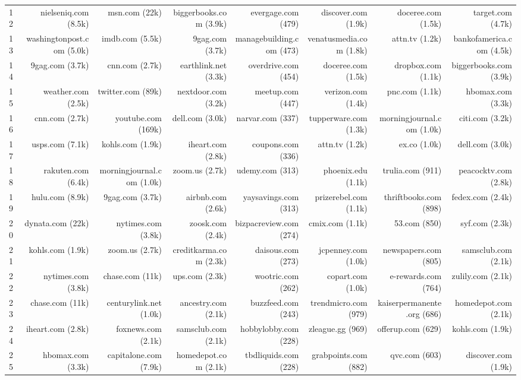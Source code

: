 \begin{table}
{\begin{tabular}[t]{lrrrrrrr}
12 & nielseniq.com (8.5k) & msn.com (22k) & biggerbooks.com (3.9k) & evergage.com (479) & discover.com (1.9k) & doceree.com (1.5k) & target.com (4.7k)\\
13 & washingtonpost.com (5.0k) & imdb.com (5.5k) & 9gag.com (3.7k) & managebuilding.com (473) & venatusmedia.com (1.8k) & attn.tv (1.2k) & bankofamerica.com (4.5k)\\
14 & 9gag.com (3.7k) & cnn.com (2.7k) & earthlink.net (3.3k) & overdrive.com (454) & doceree.com (1.5k) & dropbox.com (1.1k) & biggerbooks.com (3.9k)\\
15 & weather.com (2.5k) & twitter.com (89k) & nextdoor.com (3.2k) & meetup.com (447) & verizon.com (1.4k) & pnc.com (1.1k) & hbomax.com (3.3k)\\
16 & cnn.com (2.7k) & youtube.com (169k) & dell.com (3.0k) & narvar.com (337) & tupperware.com (1.3k) & morningjournal.com (1.0k) & citi.com (3.2k)\\
17 & usps.com (7.1k) & kohls.com (1.9k) & iheart.com (2.8k) & coupons.com (336) & attn.tv (1.2k) & ex.co (1.0k) & dell.com (3.0k)\\
18 & rakuten.com (6.4k) & morningjournal.com (1.0k) & zoom.us (2.7k) & udemy.com (313) & phoenix.edu (1.1k) & trulia.com (911) & peacocktv.com (2.8k)\\
19 & hulu.com (8.9k) & 9gag.com (3.7k) & airbnb.com (2.6k) & yaysavings.com (313) & prizerebel.com (1.1k) & thriftbooks.com (898) & fedex.com (2.4k)\\
20 & dynata.com (22k) & nytimes.com (3.8k) & zoosk.com (2.4k) & bizpacreview.com (274) & cmix.com (1.1k) & 53.com (850) & syf.com (2.3k)\\
21 & kohls.com (1.9k) & zoom.us (2.7k) & creditkarma.com (2.3k) & daisous.com (273) & jcpenney.com (1.0k) & newspapers.com (805) & samsclub.com (2.1k)\\
22 & nytimes.com (3.8k) & chase.com (11k) & ups.com (2.3k) & wootric.com (262) & copart.com (1.0k) & e-rewards.com (764) & zulily.com (2.1k)\\
23 & chase.com (11k) & centurylink.net (1.0k) & ancestry.com (2.1k) & buzzfeed.com (243) & trendmicro.com (979) & kaiserpermanente.org (686) & homedepot.com (2.1k)\\
24 & iheart.com (2.8k) & foxnews.com (2.1k) & samsclub.com (2.1k) & hobbylobby.com (228) & zleague.gg (969) & offerup.com (629) & kohls.com (1.9k)\\
25 & hbomax.com (3.3k) & capitalone.com (7.9k) & homedepot.com (2.1k) & tbdliquids.com (228) & grabpoints.com (882) & qvc.com (603) & discover.com (1.9k)\\

\end{tabular}}
\end{table}
